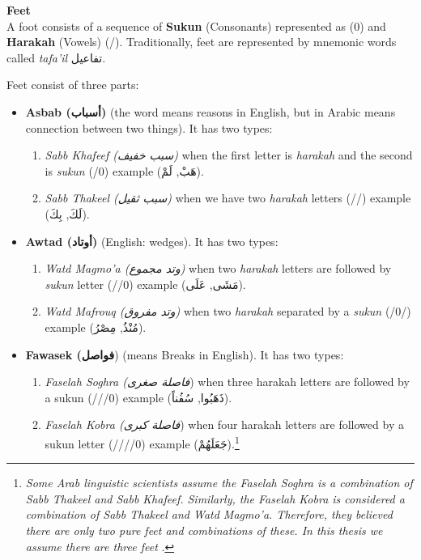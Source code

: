 \begin{definition}\label{def:feet}
  \textbf{Feet} \hfill \\  A foot consists of a sequence of \textbf{Sukun} (Consonants) represented as (0) and \textbf{Harakah} (Vowels) (/). Traditionally, feet are represented by mnemonic words called \textit{tafa’il} \textarabic{تفاعيل}.
\end{definition}%
Feet consist of three parts:
\begin{itemize}
  \item \textbf{Asbab (\textarabic{أسباب})} (the word means reasons in English, but in Arabic means connection between two things). It has two types:
  \begin{enumerate}
    \item \textit{Sabb Khafeef (\textarabic{سبب خفيف})} when the first letter is \textit{harakah} and the second is \textit{sukun} (/0) example (\textarabic{هَبْ, لَمْ}).
    \item \textit{Sabb Thakeel (\textarabic{سبب ثقيل})} when we have two \textit{harakah} letters (//) example (\textarabic{لَكَ, بِكَ}).
  \end{enumerate}
  \item \textbf{Awtad (\textarabic{أوتاد})} (English: wedges). It has two types:
  \begin{enumerate}
    \item \textit{Watd Magmo'a (\textarabic{وتد مجموع})} when two \textit{harakah} letters are followed by \textit{sukun} letter (//0) example (\textarabic{مَشَى, عَلَى}).
    \item \textit{Watd Mafrouq (\textarabic{وتد مفروق})} when  two \textit{harakah} separated by a \textit{sukun} (/0/) example (\textarabic{مُنْذُ, مِصْرُ}).
  \end{enumerate}
  \item \textbf{Fawasek (\textarabic{فواصل}}) (means Breaks in English). It has two types:
  \begin{enumerate}
    \item \textit{Faselah Soghra (\textarabic{فاصلة صغرى}})  when three harakah letters are followed by a sukun (///0) example (\textarabic{ذَهَبُوا, سُفُناً}).
    \item \textit{Faselah Kobra (\textarabic{فاصلة كبرى}}) when four harakah letters are followed by a sukun letter (////0) example (\textarabic{جَعَلَهُمْ}).\footnote{\textit{Some Arab linguistic scientists assume the Faselah Soghra is a combination of Sabb Thakeel and Sabb Khafeef. Similarly, the Faselah Kobra is considered a combination of Sabb Thakeel and Watd Magmo'a. Therefore, they believed there are only two pure feet and combinations of these. In this thesis we assume there are three feet }.}
  \end{enumerate}
\end{itemize}

